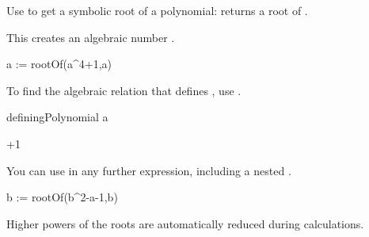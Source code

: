 {{{{{{{{{{{Use  to get a symbolic root of a polynomial:
 returns a root of .

\begin{xtc}
\begin{xtccomment}
This creates an algebraic number .
\end{xtccomment}
\begin{spadsrc}
a := rootOf(a^4+1,a) 
\end{spadsrc}
\begin{TeXOutput}
\begin{fricasmath}{1}
%
\end{fricasmath}
\end{TeXOutput}
\end{xtc}
\begin{xtc}
\begin{xtccomment}
To find the algebraic relation that defines ,
use .
\end{xtccomment}
\begin{spadsrc}
definingPolynomial a 
\end{spadsrc}
\begin{TeXOutput}
\begin{fricasmath}{2}
+1%
\end{fricasmath}
\end{TeXOutput}
\end{xtc}
\begin{xtc}
\begin{xtccomment}
You can use  in any further expression,
including a nested .
\end{xtccomment}
\begin{spadsrc}
b := rootOf(b^2-a-1,b) 
\end{spadsrc}
\begin{TeXOutput}
\begin{fricasmath}{3}
%
\end{fricasmath}
\end{TeXOutput}
\end{xtc}
\begin{xtc}
\begin{xtccomment}
Higher powers of the roots are automatically reduced during
calculations.
\end{xtccomment}
\begin{spadsrc}

\end{spadsrc}
\end{xtc}}}}}}}}}}}}
